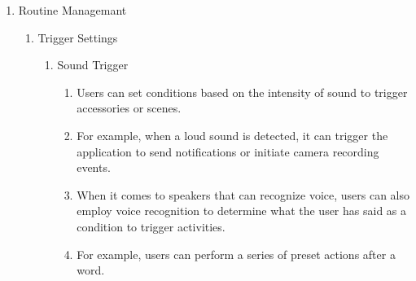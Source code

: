 \begin{enumerate}[label=\arabic*.]
      \item {\large{Routine Managemant}}\\
            \begin{enumerate}[label*={\arabic*.}]
                  \item {\large{Trigger Settings}}\\
                        \begin{enumerate}[label*={\alph*.},ref=\theenumi.\arabic*]
                              \setlength{\itemindent}{0.5cm}

                              \item {\large{Sound Trigger}}\\
                                    \begin{enumerate}[label*={\arabic*.},ref=\theenumi.\arabic*]
                                          \setlength{\itemindent}{0.5cm}
                                          \item Users can set conditions based on the intensity of sound to trigger accessories or scenes.\\
                                          \item For example, when a loud sound is detected, it can trigger the application to send notifications or initiate camera recording events.\\
                                          \item When it comes to speakers that can recognize voice, users can also employ voice recognition to determine what the user has said as a condition to trigger activities. \\
                                          \item For example, users can perform a series of preset actions after a word.\\
                                    \end{enumerate}


\end{enumerate}
\end{enumerate}
\end{enumerate}

